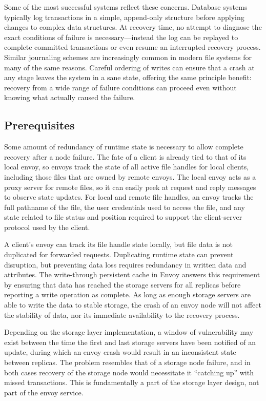 Some of the most successful systems reflect these concerns. Database systems typically log transactions in a simple, append-only structure before applying changes to complex data structures. At recovery time, no attempt to diagnose the exact conditions of failure is necessary---instead the log can be replayed to complete committed transactions or even resume an interrupted recovery process. Similar journaling schemes are increasingly common in modern file systems for many of the same reasons. Careful ordering of writes can ensure that a crash at any stage leaves the system in a sane state, offering the same principle benefit: recovery from a wide range of failure conditions can proceed even without knowing what actually caused the failure.

\subsection{Prerequisites}

Some amount of redundancy of runtime state is necessary to allow complete recovery after a node failure. The fate of a client is already tied to that of its local envoy, so envoys track the state of all active file handles for local clients, including those files that are owned by remote envoys. The local envoy acts as a proxy server for remote files, so it can easily peek at request and reply messages to observe state updates. For local and remote file handles, an envoy tracks the full pathname of the file, the user credentials used to access the file, and any state related to file status and position required to support the client-server protocol used by the client.

A client's envoy can track its file handle state locally, but file data is not duplicated for forwarded requests. Duplicating runtime state can prevent disruption, but preventing data loss requires redundancy in written data and attributes. The write-through persistent cache in Envoy answers this requirement by ensuring that data has reached the storage servers for all replicas before reporting a write operation as complete. As long as enough storage servers are able to write the data to stable storage, the crash of an envoy node will not affect the stability of data, nor its immediate availability to the recovery process.

Depending on the storage layer implementation, a window of vulnerability may exist between the time the first and last storage servers have been notified of an update, during which an envoy crash would result in an inconsistent state between replicas. The problem resembles that of a storage node failure, and in both cases recovery of the storage node would necessitate it ``catching up'' with missed transactions. This is fundamentally a part of the storage layer design, not part of the envoy service.

